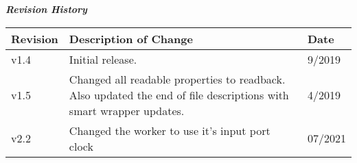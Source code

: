\iffalse
This file is protected by Copyright. Please refer to the COPYRIGHT file
distributed with this source distribution.

This file is part of OpenCPI <http://www.opencpi.org>

OpenCPI is free software: you can redistribute it and/or modify it under the
terms of the GNU Lesser General Public License as published by the Free Software
Foundation, either version 3 of the License, or (at your option) any later
version.

OpenCPI is distributed in the hope that it will be useful, but WITHOUT ANY
WARRANTY; without even the implied warranty of MERCHANTABILITY or FITNESS FOR A
PARTICULAR PURPOSE. See the GNU Lesser General Public License for more details.

You should have received a copy of the GNU Lesser General Public License along
with this program. If not, see <http://www.gnu.org/licenses/>.
\fi

\def\comp{file\_{}write}
\def\Comp{File Write}
\def\docTitle{\Comp{} Component Data Sheet}
\def\snippetpath{../../../../../doc/av/tex/snippets}

\graphicspath{{figures/}}


\maketitle
\thispagestyle{empty}
\newpage

\begin{center}
  \textit{\textbf{Revision History}}
\end{center}
\begin{longtable}{|p{}
                  |p{}
                  |p{}|}
  \hline
  \rowcolor{blue}
  \textbf{Revision} & \textbf{Description of Change} & \textbf{Date} \\
  \hline
  v1.4 & Initial release. & 9/2019 \\
  \hline
  v1.5 & Changed all readable properties to readback.  Also updated the end of file descriptions with smart wrapper updates.  & 4/2019 \\
  \hline
  v2.2 & Changed the worker to use it's input port clock & 07/2021 \\
  \hline
\end{longtable}
\newpage

